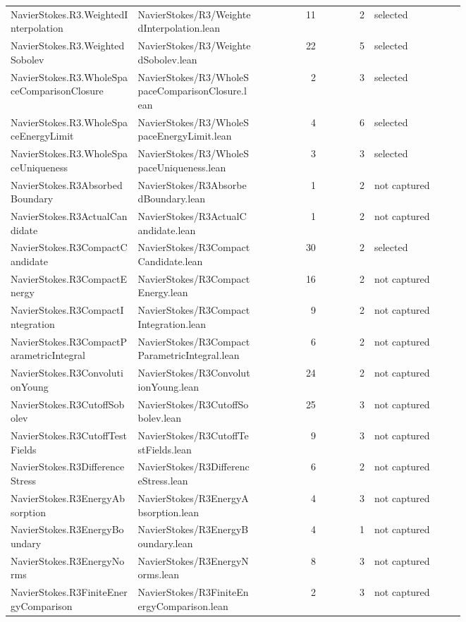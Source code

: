\documentclass[10pt]{article}
\begin{document}
\begin{longtable}{p{0.28\linewidth}p{0.27\linewidth}r r p{0.20\linewidth}}
NavierStokes.R3.WeightedInterpolation & NavierStokes/R3/WeightedInterpolation.lean & 11 & 2 & selected\\
NavierStokes.R3.WeightedSobolev & NavierStokes/R3/WeightedSobolev.lean & 22 & 5 & selected\\
NavierStokes.R3.WholeSpaceComparisonClosure & NavierStokes/R3/WholeSpaceComparisonClosure.lean & 2 & 3 & selected\\
NavierStokes.R3.WholeSpaceEnergyLimit & NavierStokes/R3/WholeSpaceEnergyLimit.lean & 4 & 6 & selected\\
NavierStokes.R3.WholeSpaceUniqueness & NavierStokes/R3/WholeSpaceUniqueness.lean & 3 & 3 & selected\\
NavierStokes.R3AbsorbedBoundary & NavierStokes/R3AbsorbedBoundary.lean & 1 & 2 & not captured\\
NavierStokes.R3ActualCandidate & NavierStokes/R3ActualCandidate.lean & 1 & 2 & not captured\\
NavierStokes.R3CompactCandidate & NavierStokes/R3CompactCandidate.lean & 30 & 2 & selected\\
NavierStokes.R3CompactEnergy & NavierStokes/R3CompactEnergy.lean & 16 & 2 & not captured\\
NavierStokes.R3CompactIntegration & NavierStokes/R3CompactIntegration.lean & 9 & 2 & not captured\\
NavierStokes.R3CompactParametricIntegral & NavierStokes/R3CompactParametricIntegral.lean & 6 & 2 & not captured\\
NavierStokes.R3ConvolutionYoung & NavierStokes/R3ConvolutionYoung.lean & 24 & 2 & not captured\\
NavierStokes.R3CutoffSobolev & NavierStokes/R3CutoffSobolev.lean & 25 & 3 & not captured\\
NavierStokes.R3CutoffTestFields & NavierStokes/R3CutoffTestFields.lean & 9 & 3 & not captured\\
NavierStokes.R3DifferenceStress & NavierStokes/R3DifferenceStress.lean & 6 & 2 & not captured\\
NavierStokes.R3EnergyAbsorption & NavierStokes/R3EnergyAbsorption.lean & 4 & 3 & not captured\\
NavierStokes.R3EnergyBoundary & NavierStokes/R3EnergyBoundary.lean & 4 & 1 & not captured\\
NavierStokes.R3EnergyNorms & NavierStokes/R3EnergyNorms.lean & 8 & 3 & not captured\\
NavierStokes.R3FiniteEnergyComparison & NavierStokes/R3FiniteEnergyComparison.lean & 2 & 3 & not captured\\

\end{longtable}
\end{document}
